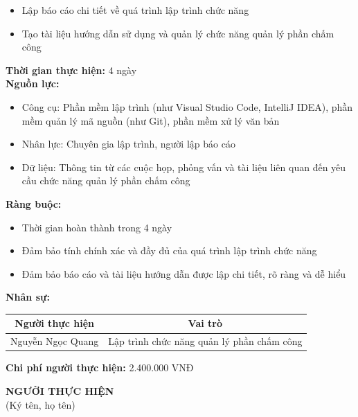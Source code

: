 {\begin{minipage}{\textwidth}
\begin{itemize}
        \item Lập báo cáo chi tiết về quá trình lập trình chức năng
        \item Tạo tài liệu hướng dẫn sử dụng và quản lý chức năng quản lý phần chấm công
    \end{itemize}
    \vspace{0.5cm}
    \noindent \textbf{Thời gian thực hiện:} 4 ngày \\
    \noindent \textbf{Nguồn lực:}
    \begin{itemize}
        \item Công cụ: Phần mềm lập trình (như Visual Studio Code, IntelliJ IDEA), phần mềm quản lý mã nguồn (như Git), phần mềm xử lý văn bản
        \item Nhân lực: Chuyên gia lập trình, người lập báo cáo
        \item Dữ liệu: Thông tin từ các cuộc họp, phỏng vấn và tài liệu liên quan đến yêu cầu chức năng quản lý phần chấm công
    \end{itemize}
    \vspace{0.5cm}
    \noindent \textbf{Ràng buộc:}
    \begin{itemize}
        \item Thời gian hoàn thành trong 4 ngày
        \item Đảm bảo tính chính xác và đầy đủ của quá trình lập trình chức năng
        \item Đảm bảo báo cáo và tài liệu hướng dẫn được lập chi tiết, rõ ràng và dễ hiểu
    \end{itemize}
    \vspace{0.5cm}
    \noindent \textbf{Nhân sự:}
    \begin{longtable}{|c|c|}
    \hline
    \textbf{Người thực hiện} & \textbf{Vai trò} \\
    \hline
    Nguyễn Ngọc Quang & Lập trình chức năng quản lý phần chấm công \\
    \hline
    \end{longtable}
    \vspace{0.5cm}
    \noindent \textbf{Chi phí người thực hiện:} 2.400.000 VNĐ \\
    \vspace{1cm}
    \begin{flushleft}
        \hspace{8cm} \textbf{NGƯỜI THỰC HIỆN} \\
        \hspace{8.8cm} (Ký tên, họ tên) \\
        \vspace{1cm}
    \end{flushleft}
    \end{minipage}
}
% 
